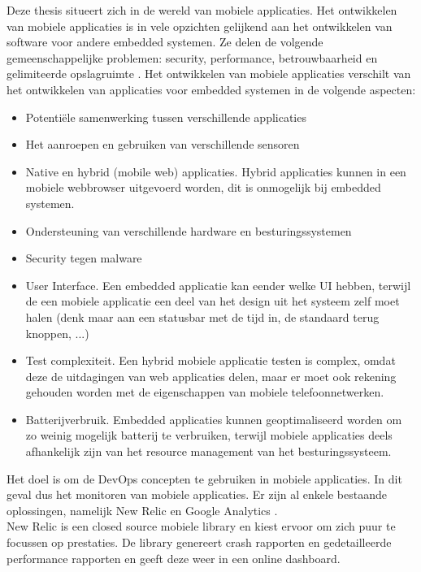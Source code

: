 Deze thesis situeert zich in de wereld van mobiele applicaties. Het ontwikkelen van mobiele applicaties is in vele opzichten gelijkend aan het ontwikkelen van software voor andere embedded systemen. Ze delen de volgende gemeenschappelijke problemen: security, performance, betrouwbaarheid en gelimiteerde opslagruimte \cite{wasserman2010software}. Het ontwikkelen van mobiele applicaties verschilt van het ontwikkelen van applicaties voor embedded systemen in de volgende aspecten:
\begin{itemize}\label{Verschillen}
\item Potenti\"ele samenwerking tussen verschillende applicaties
\item Het aanroepen en gebruiken van verschillende sensoren
\item Native en hybrid (mobile web) applicaties. Hybrid applicaties kunnen in een mobiele webbrowser uitgevoerd worden, dit is onmogelijk bij embedded systemen.
\item Ondersteuning van verschillende hardware en besturingssystemen
\item Security tegen malware
\item User Interface. Een embedded applicatie kan eender welke UI hebben, terwijl de een mobiele applicatie een deel van het design uit het systeem zelf moet halen (denk maar aan een statusbar met de tijd in, de standaard terug knoppen, ...)
\item Test complexiteit. Een hybrid mobiele applicatie testen is complex, omdat deze de uitdagingen van web applicaties delen, maar er moet ook rekening gehouden worden met de eigenschappen van mobiele telefoonnetwerken.
\item Batterijverbruik. Embedded applicaties kunnen geoptimaliseerd worden om zo weinig mogelijk batterij te verbruiken, terwijl mobiele applicaties deels afhankelijk zijn van het resource management van het besturingssysteem.
\end{itemize}


Het doel is om de DevOps concepten te gebruiken in mobiele applicaties. In dit geval dus het monitoren van mobiele applicaties. Er zijn al enkele bestaande oplossingen, namelijk New Relic \cite{NewRelic} en Google Analytics \cite{GooAna}. \\ 

New Relic is een closed source mobiele library en kiest ervoor om zich puur te focussen op prestaties. De library genereert crash rapporten en gedetailleerde performance rapporten en geeft deze weer in een online dashboard. \\

